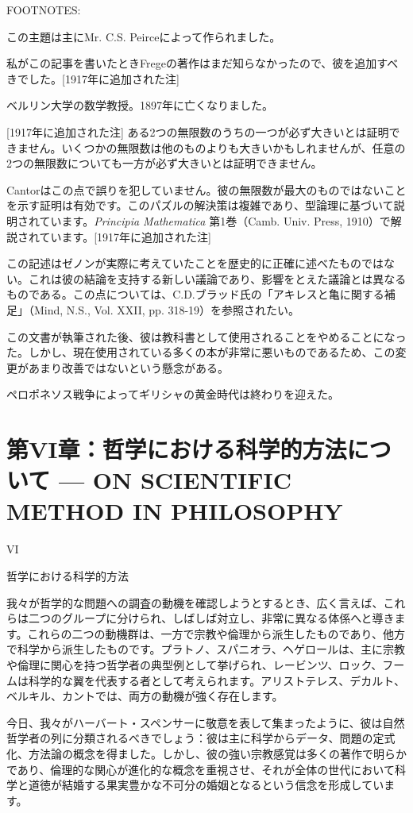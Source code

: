 \documentclass[a4paper,11pt,openany]{ltjsbook}
\begin{document}
FOOTNOTES:

 この主題は主にMr. C.S. Peirceによって作られました。

 私がこの記事を書いたときFregeの著作はまだ知らなかったので、彼を追加すべきでした。[1917年に追加された注]

 ベルリン大学の数学教授。1897年に亡くなりました。

 [1917年に追加された注] ある2つの無限数のうちの一つが必ず大きいとは証明できません。いくつかの無限数は他のものよりも大きいかもしれませんが、任意の2つの無限数についても一方が必ず大きいとは証明できません。

 Cantorはこの点で誤りを犯していません。彼の無限数が最大のものではないことを示す証明は有効です。このパズルの解決策は複雑であり、型論理に基づいて説明されています。\textit{Principia Mathematica} 第1巻（Camb. Univ. Press, 1910）で解説されています。[1917年に追加された注]

 この記述はゼノンが実際に考えていたことを歴史的に正確に述べたものではない。これは彼の結論を支持する新しい議論であり、影響をとえた議論とは異なるものである。この点については、C.D.ブラッド氏の「アキレスと亀に関する補足」（Mind, N.S., Vol. XXII, pp. 318-19）を参照されたい。

 この文書が執筆された後、彼は教科書として使用されることをやめることになった。しかし、現在使用されている多くの本が非常に悪いものであるため、この変更があまり改善ではないという懸念がある。

 ペロポネソス戦争によってギリシャの黄金時代は終わりを迎えた。


\chapter{第VI章：哲学における科学的方法について --- {ON SCIENTIFIC METHOD IN PHILOSOPHY}}

VI

哲学における科学的方法


我々が哲学的な問題への調査の動機を確認しようとするとき、広く言えば、これらは二つのグループに分けられ、しばしば対立し、非常に異なる体係へと導きます。これらの二つの動機群は、一方で宗教や倫理から派生したものであり、他方で科学から派生したものです。プラトノ、スパニオラ、ヘゲロールは、主に宗教や倫理に関心を持つ哲学者の典型例として挙げられ、レービンツ、ロック、フームは科学的な翼を代表する者として考えられます。アリストテレス、デカルト、ベルキル、カントでは、両方の動機が強く存在します。

今日、我々がハーバート・スペンサーに敬意を表して集まったように、彼は自然哲学者の列に分類されるべきでしょう：彼は主に科学からデータ、問題の定式化、方法論の概念を得ました。しかし、彼の強い宗教感覚は多くの著作で明らかであり、倫理的な関心が進化的な概念を重視させ、それが全体の世代において科学と道徳が結婚する果実豊かな不可分の婚姻となるという信念を形成しています。
\end{document}

